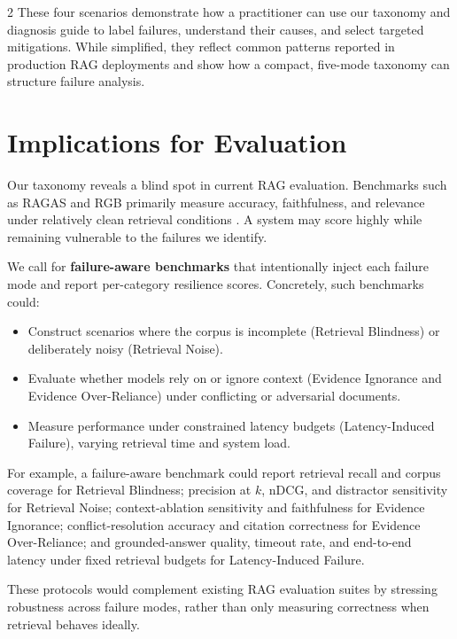 \documentclass[11pt,a4paper]{article}
\begin{document}
\begin{multicols}{2}
These four scenarios demonstrate how a practitioner can use our taxonomy and diagnosis guide to label failures, understand their causes, and select targeted mitigations. While simplified, they reflect common patterns reported in production RAG deployments and show how a compact, five-mode taxonomy can structure failure analysis.

\section{Implications for Evaluation}
\label{sec:evaluation}

Our taxonomy reveals a blind spot in current RAG evaluation. Benchmarks such as RAGAS and RGB primarily measure accuracy, faithfulness, and relevance under relatively clean retrieval conditions \cite{ragas2024,rgb2024}. A system may score highly while remaining vulnerable to the failures we identify.

We call for \textbf{failure-aware benchmarks} that intentionally inject each failure mode and report per-category resilience scores. Concretely, such benchmarks could:
\begin{itemize}[leftmargin=*,nosep]
\item Construct scenarios where the corpus is incomplete (Retrieval Blindness) or deliberately noisy (Retrieval Noise).
\item Evaluate whether models rely on or ignore context (Evidence Ignorance and Evidence Over-Reliance) under conflicting or adversarial documents.
\item Measure performance under constrained latency budgets (Latency-Induced Failure), varying retrieval time and system load.
\end{itemize}

For example, a failure-aware benchmark could report retrieval recall and corpus coverage for Retrieval Blindness; precision at $k$, nDCG, and distractor sensitivity for Retrieval Noise; context-ablation sensitivity and faithfulness for Evidence Ignorance; conflict-resolution accuracy and citation correctness for Evidence Over-Reliance; and grounded-answer quality, timeout rate, and end-to-end latency under fixed retrieval budgets for Latency-Induced Failure.

These protocols would complement existing RAG evaluation suites by stressing robustness across failure modes, rather than only measuring correctness when retrieval behaves ideally.


\end{multicols}
\end{document}
